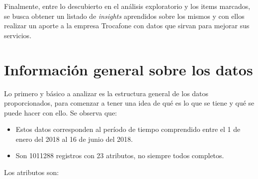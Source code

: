 \documentclass[a4paper]{article}
\begin{document}
Finalmente, entre lo descubierto en el análisis exploratorio y los items marcados, se busca obtener un listado de \textit{insights} aprendidos sobre los mismos y con ellos realizar un aporte a la empresa Trocafone con datos que sirvan para mejorar sus servicios. 

\section{Información general sobre los datos}

Lo primero y básico a analizar es la estructura general de los datos proporcionados, para comenzar a tener una idea de qué es lo que se tiene y qué se puede hacer con ello. Se observa que:

\begin{itemize}
\item Estos datos corresponden al período de tiempo comprendido entre el 1 de enero del 2018 al 16 de junio del 2018.
\item Son 1011288 registros con 23 atributos, no siempre todos completos.
\end{itemize}

Los atributos son:
\end{document}
